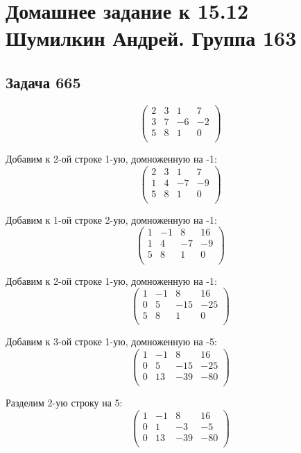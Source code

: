 

	\section{Домашнее задание к 15.12 \\ Шумилкин Андрей. Группа 163} 
	\subsection{Задача 665}
	\[
	\begin{pmatrix}
	2 & 3 & 1 & 7 \\
	3 & 7 & -6 & -2 \\
	5 & 8 & 1 & 0 \\
	\end{pmatrix}
	\]
	
	Добавим к 2-ой строке 1-ую, домноженную на -1:
	\[
	\begin{pmatrix}
	2 & 3 & 1 & 7 \\
	1 & 4 & -7 & -9 \\
	5 & 8 & 1 & 0 \\
	\end{pmatrix}
	\]
	
	Добавим к 1-ой строке 2-ую, домноженную на -1:
	\[
	\begin{pmatrix}
	1 & -1 & 8 & 16 \\
	1 & 4 & -7 & -9 \\
	5 & 8 & 1 & 0 \\
	\end{pmatrix}
	\]
	
	Добавим к 2-ой строке 1-ую, домноженную на -1:
	\[
	\begin{pmatrix}
	1 & -1 & 8 & 16 \\
	0 & 5 & -15 & -25 \\
	5 & 8 & 1 & 0 \\
	\end{pmatrix}
	\]
	
	Добавим к 3-ой строке 1-ую, домноженную на -5:
	\[
	\begin{pmatrix}
	1 & -1 & 8 & 16 \\
	0 & 5 & -15 & -25 \\
	0 & 13 & -39 & -80 \\
	\end{pmatrix}
	\]
	
	Разделим 2-ую строку на 5:
	\[
	\begin{pmatrix}
	1 & -1 & 8 & 16 \\
	0 & 1 & -3 & -5 \\
	0 & 13 & -39 & -80 \\
	\end{pmatrix}
	\]
	

